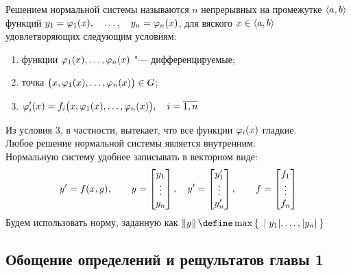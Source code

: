 \begin{definition}
    Решением нормальной системы  называются $ n $ непрерывных на промежутке $ \Braket{a, b} $ функций $ y_1 = \varphi_1(x), \quad \dots, \quad y_n = \varphi_n(x) $, для вяского $ x \in \Braket{a, b} $ удовлетворяющих следующим условиям:
    \begin{enumerate}
    	\item функции $ \varphi_1(x), \dots, \varphi_n(x) $ "--- дифференцируемые;
        \item точка $ \big( x, \varphi_1(x), \dots, \varphi_n(x) \big) \in G $;
        \item $ \varphi_i'(x) = f_i \big( x, \varphi_1(x), \dots, \varphi_n(x) \big), \quad i = \overline{1, n} $
    \end{enumerate}
\end{definition}

Из условия 3, в частности, вытекает, что все функции $ \varphi_i(x) $ гладкие. \\
Любое решение нормальной системы является внутренним. \\
Нормальную систему удобнее записывать в векторном виде:
$$ y' = f(x, y), \qquad y =  \begin{bmatrix} {y_1} \\ \vdots \\ {y_n} \end{bmatrix} , \quad y' =  \begin{bmatrix} {y_1'} \\ \vdots \\ {y_n'} \end{bmatrix} , \qquad f =  \begin{bmatrix} {f_1} \\ \vdots \\ {f_n} \end{bmatrix}  $$
Будем использовать норму, заданную как $ \norm{y} \define \max\set{|y_1|, \dots, |y_n|} $

\subsection{Обощение определений и рещультатов главы 1}

